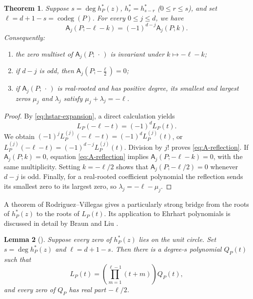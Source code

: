 \documentclass[reqno, 12pt]{article}
\numberwithin{equation}{section}
\newtheorem{theorem}{Theorem}[section]
\newtheorem{lemma}[theorem]{Lemma}
\theoremstyle{definition}
\newcommand{\codeg}{\operatorname{codeg}}
\newcommand{\A}{\mathsf{A}}
\begin{document}
\begin{theorem}\label{thm:palindromic-reflection}
Suppose $s=\deg h_P^*(z)$, $h_r^*=h_{s-r}^*$ ($0\leq r\leq s$), and set $\ell=d+1-s=\codeg(P)$.
For every $0\leq j\leq d$, we have 
\begin{equation}\label{eq:A-reflection}
\A_j(P;-\ell-k)=(-1)^{d-j}\A_j(P;k).
\end{equation}
Consequently:
\begin{enumerate}
 \item the zero multiset of $\A_j(P;\,\cdot\,)$ is invariant under $k\mapsto-\ell-k$;
 \item if $d-j$ is odd, then $\A_j\!\left(P;-\frac{\ell}{2}\right)=0$;
 \item if $\A_j(P;\,\cdot\,)$ is real-rooted and has positive degree, its smallest and largest zeros $\mu_j$ and $\lambda_j$ satisfy $\mu_j+\lambda_j=-\ell$.
\end{enumerate}
\end{theorem}
\begin{proof}
By \eqref{eq:hstar-expansion}, a direct calculation yields
\begin{equation}\label{eq:gorenstein-functional-equation}
 L_P(-\ell-t)=(-1)^dL_P(t).
\end{equation}
We obtain $(-1)^jL_P^{(j)}(-\ell-t)=(-1)^dL_P^{(j)}(t)$, 
or $L_P^{(j)}(-\ell-t)=(-1)^{d-j}L_P^{(j)}(t)$. Division by $j!$ proves \eqref{eq:A-reflection}.
If $\A_j(P;k)=0$, equation \eqref{eq:A-reflection} implies $\A_j(P;-\ell-k)=0$, with the same multiplicity.  Setting
$k=-\ell/2$ shows that $\A_j(P;-\ell/2)=0$ whenever $d-j$ is odd.
Finally, for a real-rooted coefficient polynomial the reflection sends its smallest zero to its largest zero, so $\lambda_j=-\ell-\mu_j$.
\end{proof}


A theorem of Rodriguez--Villegas \cite{RodriguezVillegas2002} gives a
particularly strong bridge from the roots of $h_P^*(z)$ to the roots of
$L_P(t)$.  Its application to Ehrhart polynomials is discussed in detail
by Braun and Liu \cite{BraunLiu2021}.

\begin{lemma}[\cite{RodriguezVillegas2002}]\label{thm:RV-ehrhart}
Suppose every zero of $h_P^*(z)$ lies on the unit circle.  Set $s=\deg h_P^*(z)$ and $\ell=d+1-s$.
Then there is a degree-$s$ polynomial $Q_P(t)$ such that
\begin{equation}\label{eq:RV-factorization}
L_P(t)=\left(\prod_{m=1}^{\ell-1}(t+m)\right)Q_P(t),
\end{equation}
and every zero of $Q_P$ has real part $-\ell/2$.
\end{lemma}
\end{document}
